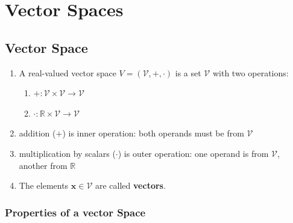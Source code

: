 \chapter{Vector Spaces}


\section{Vector Space}

\begin{enumerate}
    \item 
    \begin{definition}
        A real-valued vector space $V = (\mathcal{V}, +, \cdot)$ is a set $\mathcal{V}$ with two operations:
        \hfill \cite{mfml/book/mml/Deisenroth-Faisal-Ong}
        \begin{enumerate}
            \item[] $+ :  \mathcal{V} \times \mathcal{V} \to \mathcal{V}$
            \hfill \cite{mfml/book/mml/Deisenroth-Faisal-Ong}
    
            \item[] $\cdot: \mathbb{R} \times \mathcal{V} \to \mathcal{V}$ 
            \hfill \cite{mfml/book/mml/Deisenroth-Faisal-Ong}
        \end{enumerate}
    \end{definition}


    \item addition ($+$) is inner operation: both operands must be from $\mathcal{V}$
    \hfill \cite{mfml/book/mml/Deisenroth-Faisal-Ong}

    \item multiplication by scalars ($\cdot$) is outer operation: one operand is from $\mathcal{V}$, another from $\mathbb{R}$
    \hfill \cite{mfml/book/mml/Deisenroth-Faisal-Ong}

    \item The elements $\bm{x} \in \mathcal{V}$ are called \textbf{vectors}.
    \hfill \cite{mfml/book/mml/Deisenroth-Faisal-Ong}
\end{enumerate}


\subsection{Properties of a vector Space}

